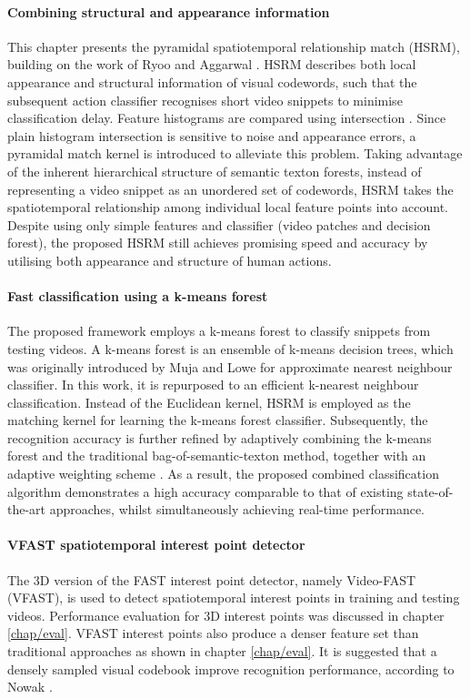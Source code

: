 \paragraph{Combining structural and appearance information} This chapter presents the pyramidal spatiotemporal relationship match (HSRM), building on the work of Ryoo and Aggarwal \cite{Ryoo2009}. HSRM describes both local appearance and structural information of visual codewords, such that the subsequent action classifier recognises short video snippets to minimise classification delay. Feature histograms are compared using intersection \cite{Ryoo2009}. Since plain histogram intersection is sensitive to noise and appearance errors, a pyramidal match kernel \cite{Grauman2005} is introduced to alleviate this problem. Taking advantage of the inherent hierarchical structure of semantic texton forests, instead of representing a video snippet as an unordered set of codewords, HSRM takes the spatiotemporal relationship among individual local feature points into account. Despite using only simple features and classifier (video patches and decision forest), the proposed HSRM still achieves promising speed and accuracy by utilising both appearance and structure of human actions. 


\paragraph{Fast classification using a k-means forest} The proposed framework employs a k-means forest to classify snippets from testing videos. A k-means forest is an ensemble of k-means decision trees, which was originally introduced by Muja and Lowe \cite{Muja2009} for approximate nearest neighbour classifier. In this work, it is repurposed to an efficient k-nearest neighbour classification. Instead of the Euclidean kernel, HSRM is employed as the matching kernel for learning the k-means forest classifier. Subsequently, the recognition accuracy is further refined by adaptively combining the k-means forest and the traditional bag-of-semantic-texton method, together with an adaptive weighting scheme \cite{Shotton2008}. As a result, the proposed combined classification algorithm demonstrates a high accuracy comparable to that of existing state-of-the-art approaches, whilst simultaneously achieving real-time performance. 

\paragraph{VFAST spatiotemporal interest point detector} The 3D version of the FAST interest point detector, namely Video-FAST (VFAST), is used to detect spatiotemporal interest points in training and testing videos. Performance evaluation for 3D interest points was discussed in chapter \ref{chap/eval}. VFAST interest points also produce a denser feature set than traditional approaches as shown in chapter \ref{chap/eval}. It is suggested that a densely sampled visual codebook improve recognition performance, according to Nowak \etal \cite{Nowak2006}.

